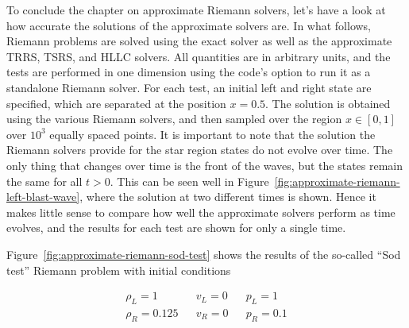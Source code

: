 To conclude the chapter on approximate Riemann solvers, let's have a look at how accurate the
solutions of the approximate solvers are. In what follows, Riemann problems are solved using the
exact solver as well as the approximate TRRS, TSRS, and HLLC solvers. All quantities are in
arbitrary units, and the tests are performed in one dimension using the \meshhydro code's option
to run it as a standalone Riemann solver. For each test, an initial left and right state are
specified, which are separated at the position $x = 0.5$. The solution is obtained using the various
Riemann solvers, and then sampled over the region $x \in [0, 1]$ over $10^3$ equally spaced points.
It is important to note that the solution the Riemann solvers provide for the star
region states do not evolve over time. The only thing that changes over time is the front of the
waves, but the states remain the same for all $t > 0$. This can be seen well in
Figure~\ref{fig:approximate-riemann-left-blast-wave}, where the solution at two different times is
shown. Hence it makes little sense to compare how well the approximate solvers perform as time
evolves, and the results for each test are shown for only a single time.


Figure~\ref{fig:approximate-riemann-sod-test} shows the results of the so-called ``Sod test''
Riemann problem with initial conditions

\begin{align}
    \rho_L = 1 && v_L = 0 && p_L = 1 \label{eq:sod-test-ICs} \\
    \rho_R = 0.125 && v_R = 0 && p_R = 0.1      \nonumber
\end{align}

